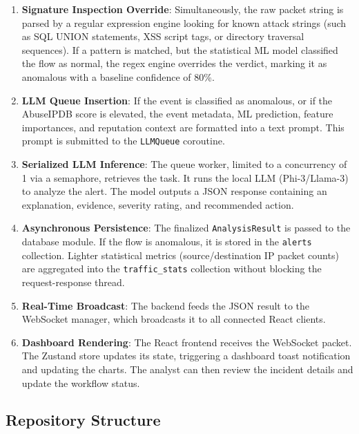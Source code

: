 \documentclass[12pt,a4paper]{report}
\begin{document}
\begin{enumerate}[leftmargin=1.5em]
  \item \textbf{Signature Inspection Override}: Simultaneously, the raw packet string is parsed by a regular expression engine looking for known attack strings (such as SQL UNION statements, XSS script tags, or directory traversal sequences). If a pattern is matched, but the statistical ML model classified the flow as normal, the regex engine overrides the verdict, marking it as anomalous with a baseline confidence of 80\%.
  \item \textbf{LLM Queue Insertion}: If the event is classified as anomalous, or if the AbuseIPDB score is elevated, the event metadata, ML prediction, feature importances, and reputation context are formatted into a text prompt. This prompt is submitted to the \texttt{LLMQueue} coroutine.
  \item \textbf{Serialized LLM Inference}: The queue worker, limited to a concurrency of 1 via a semaphore, retrieves the task. It runs the local LLM (Phi-3/Llama-3) to analyze the alert. The model outputs a JSON response containing an explanation, evidence, severity rating, and recommended action.
  \item \textbf{Asynchronous Persistence}: The finalized \texttt{AnalysisResult} is passed to the database module. If the flow is anomalous, it is stored in the \texttt{alerts} collection. Lighter statistical metrics (source/destination IP packet counts) are aggregated into the \texttt{traffic\_stats} collection without blocking the request-response thread.
  \item \textbf{Real-Time Broadcast}: The backend feeds the JSON result to the WebSocket manager, which broadcasts it to all connected React clients.
  \item \textbf{Dashboard Rendering}: The React frontend receives the WebSocket packet. The Zustand store updates its state, triggering a dashboard toast notification and updating the charts. The analyst can then review the incident details and update the workflow status.
\end{enumerate}

\subsection{Repository Structure}
\end{document}
